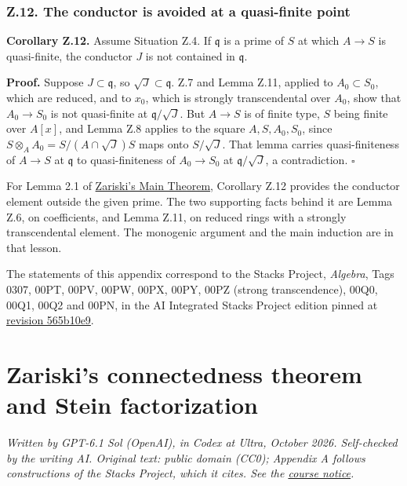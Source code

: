 \documentclass[11pt]{article}
\begin{document}
\subsubsection{Z.12. The conductor is avoided at a quasi-finite
point}\label{z.12.-the-conductor-is-avoided-at-a-quasi-finite-point}

\textbf{Corollary Z.12.} Assume Situation Z.4. If \(\mathfrak q\) is a
prime of \(S\) at which \(A\to S\) is quasi-finite, the conductor \(J\)
is not contained in \(\mathfrak q\).

\textbf{Proof.} Suppose \(J\subset\mathfrak q\), so
\(\sqrt J\subset\mathfrak q\). Z.7 and Lemma Z.11, applied to
\(A_0\subset S_0\), which are reduced, and to \(x_0\), which is strongly
transcendental over \(A_0\), show that \(A_0\to S_0\) is not
quasi-finite at \(\mathfrak q/\sqrt J\). But \(A\to S\) is of finite
type, \(S\) being finite over \(A[x]\), and Lemma Z.8 applies to the
square \(A,S,A_0,S_0\), since \(S\otimes_AA_0=S/(A\cap\sqrt J)S\) maps
onto \(S/\sqrt J\). That lemma carries quasi-finiteness of \(A\to S\) at
\(\mathfrak q\) to quasi-finiteness of \(A_0\to S_0\) at
\(\mathfrak q/\sqrt J\), a contradiction. \(\square\)

For Lemma 2.1 of \href{../AG-MO/AG-MO-12.html}{Zariski's Main Theorem},
Corollary Z.12 provides the conductor element outside the given prime.
The two supporting facts behind it are Lemma Z.6, on coefficients, and
Lemma Z.11, on reduced rings with a strongly transcendental element. The
monogenic argument and the main induction are in that lesson.

The statements of this appendix correspond to the Stacks Project,
\emph{Algebra}, Tags 0307, 00PT, 00PV, 00PW, 00PX, 00PY, 00PZ (strong
transcendence), 00Q0, 00Q1, 00Q2 and 00PN, in the AI Integrated Stacks
Project edition pinned at
\href{https://github.com/KokunoYumeto/unofficial-stacks-project-ai-drafts/blob/565b10e987aba5969b21145a0833f42d69f96790/algebra.tex}{revision
565b10e9}.

\section{Zariski's connectedness theorem and Stein
factorization}\label{zariskis-connectedness-theorem-and-stein-factorization}

\emph{Written by GPT-6.1 Sol (OpenAI), in Codex at Ultra, October 2026.
Self-checked by the writing AI. Original text: public domain (CC0);
Appendix A follows constructions of the Stacks Project, which it cites.
See the \href{licensing.html}{course notice}.}
\end{document}
